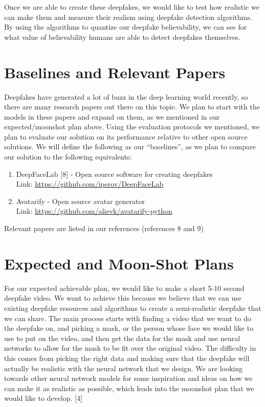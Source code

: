 \documentclass{article}
\begin{document}
Once we are able to create these deepfakes, we would like to test how realistic we can make them and measure their realism using deepfake detection algorithms. By using the algorithms to quantize our deepfake believability, we can see for what value of believability humans are able to detect deepfakes themselves. 


\section{Baselines and Relevant Papers}
Deepfakes have generated a lot of buzz in the deep learning world recently, so there are many research papers out there on this topic. We plan to start with the models in these papers and expand on them, as we mentioned in our expected/moonshot plan above. Using the evaluation protocols we mentioned, we plan to evaluate our solution on its performance relative to other open source solutions. We will define the following as our “baselines”, as we plan to compare our solution to the following equivalents:

    \begin{enumerate}
        \item DeepFaceLab [8] - Open source software for creating deepfakes \\
        Link: \url{https://github.com/iperov/DeepFaceLab}
        \item Avatarify - Open source avatar generator \\
                Link: \url{https://github.com/alievk/avatarify-python}

    \end{enumerate}

Relevant papers are listed in our references (references 8 and 9) 

\section{Expected and Moon-Shot Plans}

For our expected achievable plan, we would like to make a short 5-10 second deepfake video. We want to achieve this because we believe that we can use existing deepfake resources and algorithms to create a semi-realistic deepfake that we can share. The main process starts with finding a video that we want to do the deepfake on, and picking a mask, or the person whose face we would like to use to put on the video, and then get the data for the mask and use neural networks to allow for the mask to be fit over the original video. The difficulty in this comes from picking the right data and making sure that the deepfake will actually be realistic with the neural network that we design. We are looking towards other neural network models for some inspiration and ideas on how we can make it as realistic as possible, which leads into the moonshot plan that we would like to develop. [4] 
\end{document}
